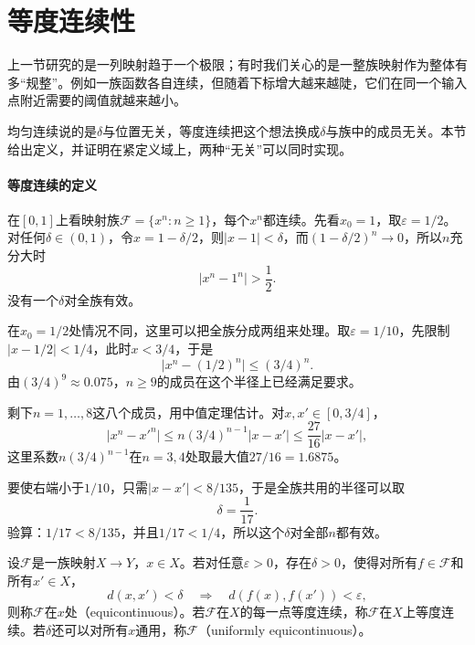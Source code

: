 \section{等度连续性}
\label{sec:mmap-equicontinuity}

上一节研究的是一列映射趋于一个极限；有时我们关心的是一整族映射作为整体有多“规整”。例如一族函数各自连续，但随着下标增大越来越陡，它们在同一个输入点附近需要的阈值就越来越小。

均匀连续说的是$\delta$与位置无关，等度连续把这个想法换成$\delta$与族中的成员无关。本节给出定义，并证明在紧定义域上，两种“无关”可以同时实现。

\paragraph{等度连续的定义}
在$[0,1]$上看映射族$\mathcal F=\{x^n:n\geq1\}$，每个$x^n$都连续。先看$x_0=1$，取$\varepsilon=1/2$。对任何$\delta\in(0,1)$，令$x=1-\delta/2$，则$\lvert x-1\rvert<\delta$，而$(1-\delta/2)^n\to0$，所以$n$充分大时
\[
 \lvert x^n-1^n\rvert>\frac12.
\]
没有一个$\delta$对全族有效。

在$x_0=1/2$处情况不同，这里可以把全族分成两组来处理。取$\varepsilon=1/10$，先限制$\lvert x-1/2\rvert<1/4$，此时$x<3/4$，于是
\[
 \lvert x^n-(1/2)^n\rvert\leq(3/4)^n.
\]
由$(3/4)^9\approx0.075$，$n\geq9$的成员在这个半径上已经满足要求。

剩下$n=1,\ldots,8$这八个成员，用中值定理估计。对$x,x'\in[0,3/4]$，
\[
 \lvert x^n-x'^n\rvert\leq n(3/4)^{n-1}\lvert x-x'\rvert\leq\frac{27}{16}\lvert x-x'\rvert,
\]
这里系数$n(3/4)^{n-1}$在$n=3,4$处取最大值$27/16=1.6875$。

要使右端小于$1/10$，只需$\lvert x-x'\rvert<8/135$，于是全族共用的半径可以取
\[
 \delta=\frac1{17}.
\]
验算：$1/17<8/135$，并且$1/17<1/4$，所以这个$\delta$对全部$n$都有效。

\begin{definition}[等度连续]
\label{def:mmap-equicontinuous}
设$\mathcal F$是一族映射$X\to Y$，$x\in X$。若对任意$\varepsilon>0$，存在$\delta>0$，使得对所有$f\in\mathcal F$和所有$x'\in X$，
\begin{equation}
 d(x,x')<\delta
 \quad\Longrightarrow\quad
 d(f(x),f(x'))<\varepsilon,
 \label{eq:mmap-equicontinuous}
\end{equation}
则称$\mathcal F$在$x$处（equicontinuous）。若$\mathcal F$在$X$的每一点等度连续，称$\mathcal F$在$X$上等度连续。若$\delta$还可以对所有$x$通用，称$\mathcal F$（uniformly equicontinuous）。
\end{definition}

